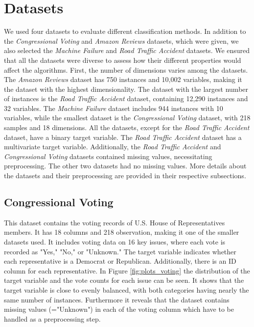 \documentclass{article}
\begin{document}
\section{Datasets}
We used four datasets to evaluate different classification methods. In addition to the \textit{Congressional Voting} and \textit{Amazon Reviews} datasets, which were given, we also selected the \textit{Machine Failure} and \textit{Road Traffic Accident} datasets. We ensured that all the datasets were diverse to assess how their different properties would affect the algorithms. \newline
First, the number of dimensions varies among the datasets. The \textit{Amazon Reviews} dataset has 750 instances and 10,002 variables, making it the dataset with the highest dimensionality. The dataset with the largest number of instances is the \textit{Road Traffic Accident} dataset, containing 12,290 instances and 32 variables. The \textit{Machine Failure} dataset includes 944 instances with 10 variables, while the smallest dataset is the \textit{Congressional Voting} dataset, with 218 samples and 18 dimensions.\newline
All the datasets, except for the \textit{Road Traffic Accident} dataset, have a binary target variable. The \textit{Road Traffic Accident} dataset has a multivariate target variable. Additionally, the \textit{Road Traffic Accident} and \textit{Congressional Voting} datasets contained missing values, necessitating preprocessing. The other two datasets had no missing values.\newline
More details about the datasets and their preprocessing are provided in their respective subsections.


\subsection{Congressional Voting}
This dataset contains the voting records of U.S. House of Representatives members. It has 18 columns and 218 observation, making it one of the smaller datasets used. It includes voting data on 16 key issues, where each vote is recorded as "Yes," "No," or "Unknown." The target variable indicates whether each representative is a Democrat or Republican. Additionally, there is an ID column for each representative. In Figure \ref{fig:plots_voting} the distribution of the target variable and the vote counts for each issue can be seen. It shows that the target variable is close to evenly balanced, with both categories having nearly the same number of instances. Furthermore it reveals that the dataset contains missing values (="Unknown") in each of the voting column which have to be handled as a preprocessing step.
\end{document}
